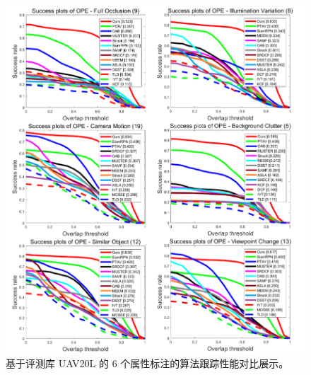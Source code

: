 \nopagebreak[3]
\begin{figure}[!t]
    \centering
    \includegraphics[width=1.0\textwidth]{Img/end/UAV20L_1.pdf}
    \caption{基于评测库 UAV20L \cite{mueller2016benchmark} 的 6 个属性标注的算法跟踪性能对比展示。}
    \label{fig:end_uav20l_attr_1}
\end{figure}
\nopagebreak[3]
